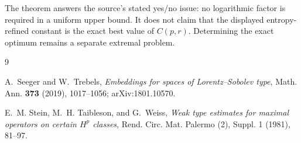 \documentclass[11pt]{article}
\newcommand{\1}{\mathbf 1}
\begin{document}
The theorem answers the source's stated yes/no issue: no logarithmic factor
is required in a uniform upper bound.  It does not claim that the displayed
entropy-refined constant is the exact best value of $C(p,r)$.  Determining
the exact optimum remains a separate extremal problem.

\begin{thebibliography}{9}

A.~Seeger and W.~Trebels,
\emph{Embeddings for spaces of Lorentz--Sobolev type},
Math. Ann. \textbf{373} (2019), 1017--1056;
arXiv:1801.10570.

E.~M. Stein, M.~H. Taibleson, and G.~Weiss,
\emph{Weak type estimates for maximal operators on certain $H^p$ classes},
Rend. Circ. Mat. Palermo (2), Suppl. 1 (1981), 81--97.

\end{thebibliography}
\end{document}
